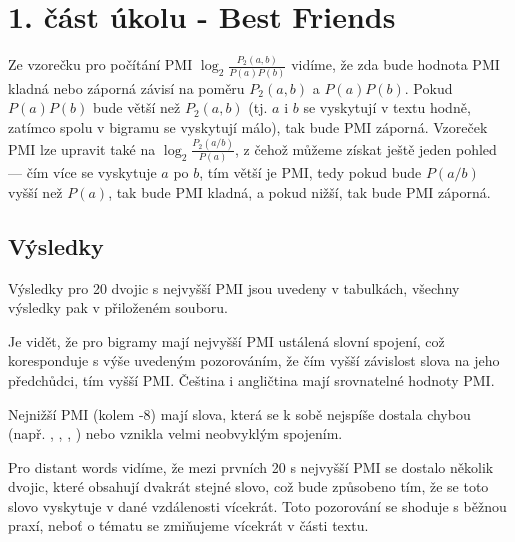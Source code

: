 \documentclass[12pt, a4paper]{report}
\theoremstyle{remark}
\begin{document}
\section*{1. část úkolu - Best Friends}

Ze vzorečku pro počítání PMI $\log_2{\frac{P_2(a,b)}{P(a)P(b)}}$ vidíme, že zda bude hodnota PMI kladná nebo záporná závisí na poměru ${P_2(a,b)}$ a ${P(a)P(b)}$. Pokud ${P(a)P(b)}$ bude větší než ${P_2(a,b)}$ (tj. $a$ i $b$ se vyskytují v textu hodně, zatímco spolu v bigramu se vyskytují málo), tak bude PMI záporná. Vzoreček PMI lze upravit také na  $\log_2{\frac{P_2(a/b)}{P(a)}}$, z čehož můžeme získat ještě jeden pohled --- čím více se vyskytuje $a$ po $b$, tím větší je PMI, tedy pokud bude $P(a/b)$ vyšší než $P(a)$, tak bude PMI kladná, a pokud nižší, tak bude PMI záporná.


\subsection*{Výsledky}

Výsledky pro 20 dvojic s nejvyšší PMI jsou uvedeny v tabulkách, všechny výsledky pak v přiloženém souboru.

Je vidět, že pro bigramy mají nejvyšší PMI ustálená slovní spojení, což koresponduje s výše uvedeným pozorováním, že čím vyšší závislost slova na jeho předchůdci, tím vyšší PMI.
Čeština i angličtina mají srovnatelné hodnoty PMI.

Nejnižší PMI (kolem -8) mají slova, která se k sobě nejspíše dostala chybou (např. , , , ) nebo vznikla velmi neobvyklým spojením.

Pro distant words vidíme, že mezi prvních 20 s nejvyšší PMI se dostalo několik dvojic, které obsahují dvakrát stejné slovo, což bude způsobeno tím, že se toto slovo vyskytuje v dané vzdálenosti vícekrát. Toto pozorování se shoduje s běžnou praxí, neboť o tématu se zmiňujeme vícekrát v části textu.
\end{document}
